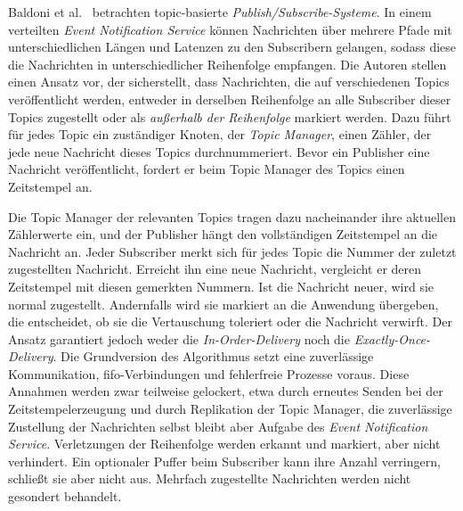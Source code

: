 Baldoni et al.~\citep{baldoni} betrachten topic-basierte \textit{Publish/Subscribe-Systeme}. In einem verteilten \textit{Event Notification Service} können Nachrichten über mehrere Pfade mit unterschiedlichen Längen und Latenzen zu den Subscribern gelangen, sodass diese die Nachrichten in unterschiedlicher Reihenfolge empfangen. Die Autoren stellen einen Ansatz vor, der sicherstellt, dass Nachrichten, die auf verschiedenen Topics veröffentlicht werden, entweder in derselben Reihenfolge an alle Subscriber dieser Topics zugestellt oder als \textit{außerhalb der Reihenfolge} markiert werden. Dazu führt für jedes Topic ein zuständiger Knoten, der \textit{Topic Manager}, einen Zähler, der jede neue Nachricht dieses Topics durchnummeriert. Bevor ein Publisher eine Nachricht veröffentlicht, fordert er beim Topic Manager des Topics einen Zeitstempel an.

\newpage

Die Topic Manager der relevanten Topics tragen dazu nacheinander ihre aktuellen Zählerwerte ein, und der Publisher hängt den vollständigen Zeitstempel an die Nachricht an. Jeder Subscriber merkt sich für jedes Topic die Nummer der zuletzt zugestellten Nachricht. Erreicht ihn eine neue Nachricht, vergleicht er deren Zeitstempel mit diesen gemerkten Nummern. Ist die Nachricht neuer, wird sie normal zugestellt. Andernfalls wird sie markiert an die Anwendung übergeben, die entscheidet, ob sie die Vertauschung toleriert oder die Nachricht verwirft. Der Ansatz garantiert jedoch weder die \textit{In-Order-Delivery} noch die \textit{Exactly-Once-Delivery}. Die Grundversion des Algorithmus setzt eine zuverlässige Kommunikation, \gls{fifo}-Verbindungen und fehlerfreie Prozesse voraus. Diese Annahmen werden zwar teilweise gelockert, etwa durch erneutes Senden bei der Zeitstempelerzeugung und durch Replikation der Topic Manager, die zuverlässige Zustellung der Nachrichten selbst bleibt aber Aufgabe des \textit{Event Notification Service}. Verletzungen der Reihenfolge werden erkannt und markiert, aber nicht verhindert. Ein optionaler Puffer beim Subscriber kann ihre Anzahl verringern, schließt sie aber nicht aus. Mehrfach zugestellte Nachrichten werden nicht gesondert behandelt.

